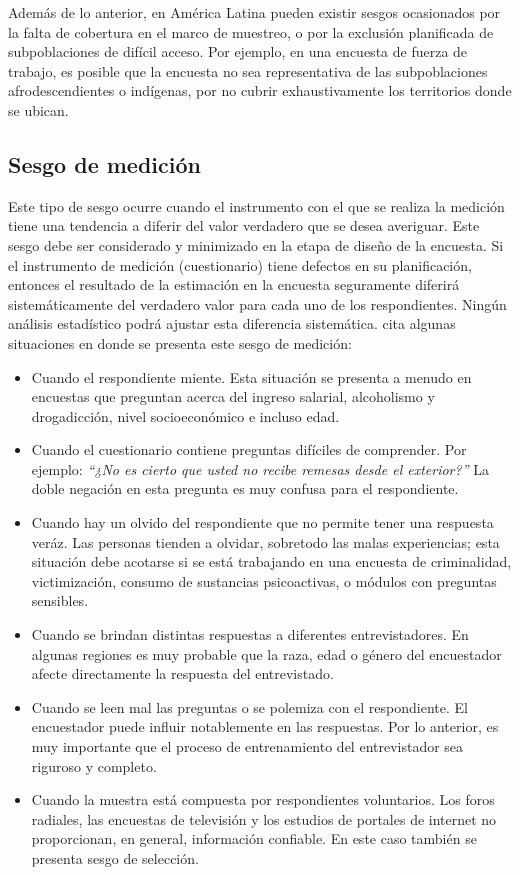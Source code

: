 \documentclass[
  12pt,
]{book}
\providecommand{\tightlist}{%
  \setlength{\itemsep}{0pt}\setlength{\parskip}{0pt}}
\begin{document}
Además de lo anterior, en América Latina pueden existir sesgos ocasionados por la falta de cobertura en el marco de muestreo, o por la exclusión planificada de subpoblaciones de difícil acceso. Por ejemplo, en una encuesta de fuerza de trabajo, es posible que la encuesta no sea representativa de las subpoblaciones afrodescendientes o indígenas, por no cubrir exhaustivamente los territorios donde se ubican.

\hypertarget{sesgo-de-mediciuxf3n}{%
\subsection{Sesgo de medición}\label{sesgo-de-mediciuxf3n}}

Este tipo de sesgo ocurre cuando el instrumento con el que se realiza la medición tiene una tendencia a diferir del valor verdadero que se desea averiguar. Este sesgo debe ser considerado y minimizado en la etapa de diseño de la encuesta. Si el instrumento de medición (cuestionario) tiene defectos en su planificación, entonces el resultado de la estimación en la encuesta seguramente diferirá sistemáticamente del verdadero valor para cada uno de los respondientes. Ningún análisis estadístico podrá ajustar esta diferencia sistemática. \citet{Loh} cita algunas situaciones en donde se presenta este sesgo de medición:

\begin{itemize}
\tightlist
\item
  Cuando el respondiente miente. Esta situación se presenta a menudo en encuestas que preguntan acerca del ingreso salarial, alcoholismo y drogadicción, nivel socioeconómico e incluso edad.
\item
  Cuando el cuestionario contiene preguntas difíciles de comprender. Por ejemplo: \emph{``¿No es cierto que usted no recibe remesas desde el exterior?''} La doble negación en esta pregunta es muy confusa para el respondiente.
\item
  Cuando hay un olvido del respondiente que no permite tener una respuesta veráz. Las personas tienden a olvidar, sobretodo las malas experiencias; esta situación debe acotarse si se está trabajando en una encuesta de criminalidad, victimización, consumo de sustancias psicoactivas, o módulos con preguntas sensibles.
\item
  Cuando se brindan distintas respuestas a diferentes entrevistadores. En algunas regiones es muy probable que la raza, edad o género del encuestador afecte directamente la respuesta del entrevistado.
\item
  Cuando se leen mal las preguntas o se polemiza con el respondiente. El encuestador puede influir notablemente en las respuestas. Por lo anterior, es muy importante que el proceso de entrenamiento del entrevistador sea riguroso y completo.
\item
  Cuando la muestra está compuesta por respondientes voluntarios. Los foros radiales, las encuestas de televisión y los estudios de portales de internet no proporcionan, en general, información confiable. En este caso también se presenta sesgo de selección.
\end{itemize}
\end{document}
